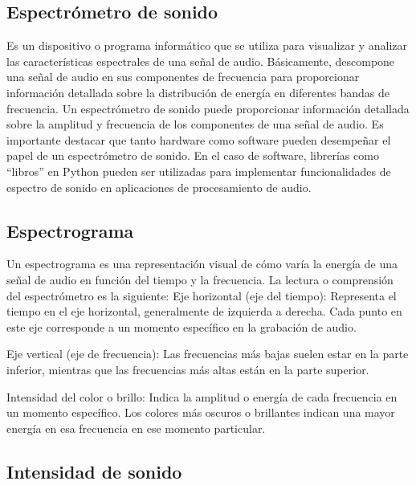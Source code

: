 \documentclass[letterpaper, 12pt]{article}
\begin{document}
\subsection*{Espectrómetro de sonido~\cite{espectometro}}

Es un dispositivo o programa informático que se utiliza
para visualizar y analizar las características espectrales
de una señal de audio. Básicamente, descompone una señal de
audio en sus componentes de frecuencia para proporcionar
información detallada sobre la distribución de energía en
diferentes bandas de frecuencia. Un espectrómetro de sonido
puede proporcionar información detallada sobre la amplitud
y frecuencia de los componentes de una señal de audio. Es
importante destacar que tanto hardware como software pueden
desempeñar el papel de un espectrómetro de sonido. En el
caso de software, librerías como ``libros'' en Python
pueden ser utilizadas para implementar funcionalidades de
espectro de sonido en aplicaciones de procesamiento de
audio.

\subsection*{Espectrograma~\cite{espectograma}}

Un espectrograma es una representación visual de cómo varía
la energía de una señal de audio en función del tiempo y la
frecuencia. La lectura o comprensión del espectrómetro es
la siguiente: Eje horizontal (eje del tiempo): Representa
el tiempo en el eje horizontal, generalmente de izquierda a
derecha. Cada punto en este eje corresponde a un momento
específico en la grabación de audio.

Eje vertical (eje de frecuencia): Las frecuencias más bajas
suelen estar en la parte inferior, mientras que las
frecuencias más altas están en la parte superior.

Intensidad del color o brillo: Indica la amplitud o energía
de cada frecuencia en un momento específico. Los colores
más oscuros o brillantes indican una mayor energía en esa
frecuencia en ese momento particular.

\subsection*{Intensidad de sonido~\cite{diapos}}
\end{document}

